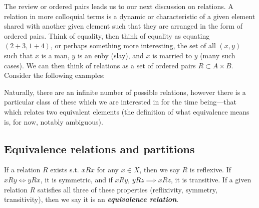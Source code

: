 \documentclass{report}
\begin{document}
The review or ordered pairs leads us to our next discussion on relations. A relation in more colloquial terms is a dynamic or characteristic of a given element shared with another given element such that they are arranged in the form of ordered pairs. Think of equality, then think of equality as equating \( (2+3,1+4) \), or perhaps something more interesting, the set of all \( (x,y) \) such that \( x \) is a man, \( y \) is an enby (slay), and \( x \) is married to \( y \) (many such cases). We can then think of relations as a set of ordered pairs \( R \subset A\times B \). Consider the following examples:

Naturally, there are an infinite number of possible relations, however there is a particular class of these which we are interested in for the time being---that which relates two equivalent elements (the definition of what equivalence means is, for now, notably ambiguous). 
\subsection{Equivalence relations and partitions}

If a relation \( R \) exists s.t. \( xRx \) for any \( x \in  X \), then we say \( R \) is reflexive. If \( xRy \iff yRx \), it is symmetric, and if \( xRy, \,  yRz \implies xRz \), it is transitive. If a given relation \( R \) satisfies all three of these properties (reflixivity, symmetry, transitivity), then we say it is an \textbf{\textit{equivalence relation}}. 


\end{document}
